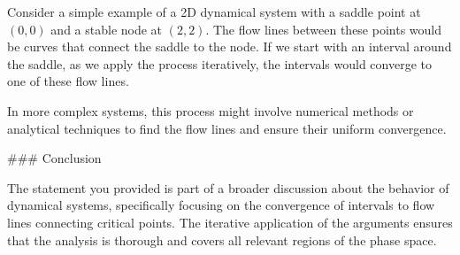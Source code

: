 Consider a simple example of a 2D dynamical system with a saddle point at \((0,0)\) and a stable node at \((2,2)\). The flow lines between these points would be curves that connect the saddle to the node. If we start with an interval around the saddle, as we apply the process iteratively, the intervals would converge to one of these flow lines.

In more complex systems, this process might involve numerical methods or analytical techniques to find the flow lines and ensure their uniform convergence.

### Conclusion

The statement you provided is part of a broader discussion about the behavior of dynamical systems, specifically focusing on the convergence of intervals to flow lines connecting critical points. The iterative application of the arguments ensures that the analysis is thorough and covers all relevant regions of the phase space.